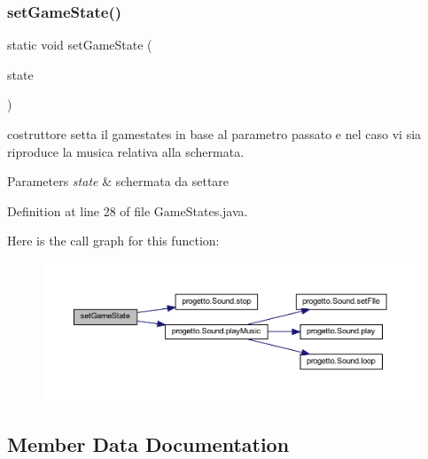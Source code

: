 \subsubsection{\texorpdfstring{set\+Game\+State()}{setGameState()}}
{\footnotesize\ttfamily static void set\+Game\+State (\begin{DoxyParamCaption}\item[{\hyperlink{enumprogetto_1_1_game_states}{Game\+States}}]{state }\end{DoxyParamCaption})\hspace{0.3cm}{\ttfamily [static]}}



costruttore setta il gamestates in base al parametro passato e nel caso vi sia riproduce la musica relativa alla schermata. 


\begin{DoxyParams}{Parameters}
{\em state} & schermata da settare \\
\hline
\end{DoxyParams}


Definition at line 28 of file Game\+States.\+java.

Here is the call graph for this function\+:\nopagebreak
\begin{figure}[H]
\begin{center}
\leavevmode
\includegraphics[width=350pt]{enumprogetto_1_1_game_states_a118b00363a0d1055d4b00bb40dd66f34_cgraph}
\end{center}
\end{figure}


\subsection{Member Data Documentation}
\mbox{\label{enumprogetto_1_1_game_states_a5019c6e9c3451a4b6891c6967bc7c520}} 
